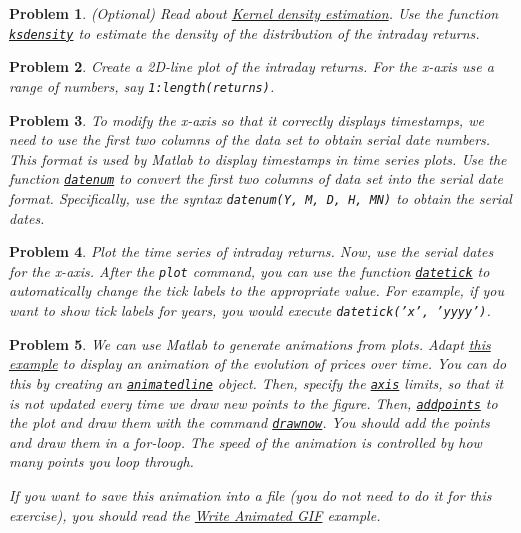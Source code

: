 \documentclass[12pt, a4paper]{article}
\newtheorem{problem}{Problem}
\begin{document}
\begin{problem}
(Optional) Read about \href{https://en.wikipedia.org/wiki/Kernel\_density\_estimation}{Kernel density estimation}.
Use the function \href{https://www.mathworks.com/help/stats/ksdensity.html?s\_tid=doc\_ta}{\texttt{ksdensity}} to estimate the density of the distribution of the intraday returns.
\end{problem}

\begin{problem}
Create a 2D-line plot of the intraday returns.
For the x-axis use a range of numbers, say \texttt{1:length(returns)}.
\end{problem}

\begin{problem}
To modify the x-axis so that it correctly displays timestamps, we need to use the first two columns of the data set to obtain serial date numbers.
This format is used by Matlab to display timestamps in time series plots.
Use the function \href{https://www.mathworks.com/help/matlab/ref/datenum.html}{\texttt{datenum}} to convert the first two columns of data set into the serial date format.
Specifically, use the syntax \texttt{datenum(Y, M, D, H, MN)} to obtain the serial dates.
\end{problem}

\begin{problem}
Plot the time series of intraday returns.
Now, use the serial dates for the x-axis.
After the \texttt{plot} command, you can use the function \href{https://www.mathworks.com/help/matlab/ref/datetick.html?s\_tid=doc\_ta}{\texttt{datetick}} to automatically change the tick labels to the appropriate value.
For example, if you want to show tick labels for years, you would execute \texttt{datetick('x', 'yyyy')}.
\end{problem}

\begin{problem}
We can use Matlab to generate animations from plots.
Adapt \href{https://www.mathworks.com/help/matlab/creating\_plots/line-animation-of-streaming-data.html}{this example} to display an animation of the evolution of prices over time.
You can do this by creating an \href{https://www.mathworks.com/help/matlab/ref/animatedline.html?s\_tid=doc\_ta}{\texttt{animatedline}} object.
Then, specify the \href{https://www.mathworks.com/help/matlab/ref/axis.html?s\_tid=doc\_ta\#buk989s-1-limits}{\texttt{axis}} limits, so that it is not updated every time we draw new points to the figure.
Then, \href{https://www.mathworks.com/help/matlab/ref/addpoints.html?s\_tid=doc\_ta}{\texttt{addpoints}} to the plot and draw them with the command \href{https://www.mathworks.com/help/matlab/ref/drawnow.html?s\_tid=doc\_ta}{\texttt{drawnow}}.
You should add the points and draw them in a for-loop.
The speed of the animation is controlled by how many points you loop through.

If you want to save this animation into a file (you do not need to do it for this exercise), you should read the \href{https://www.mathworks.com/help/matlab/ref/imwrite.html\#btv452g-1}{Write Animated GIF} example.
\end{problem}
\newpage
\printbibliography
\newpage
\end{document}
